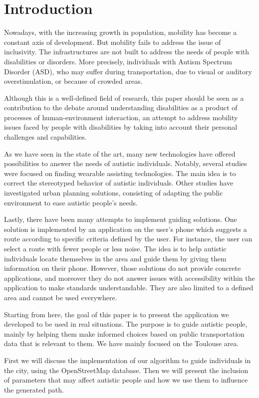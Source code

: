 \section{Introduction}


Nowadays, with the increasing growth in population, mobility has become a constant axis of development. But mobility fails to address the issue of inclusivity. The infrastructures are not built to address the needs of people with disabilities or disorders. More precisely, individuals with Autism Spectrum Disorder (ASD), who may suffer during transportation, due to visual or auditory overstimulation, or because of crowded areas.\newline


Although this is a well-defined field of research, this paper should be seen as a contribution to the debate around understanding disabilities as a product of processes of human-environment interaction, an attempt to address mobility issues faced by people with disabilities by taking into account their personal challenges and capabilities.\newline

As we have seen in the state of the art, many new technologies have offered possibilities to answer the needs of autistic individuals. Notably, several studies were focused on finding wearable assisting technologies. The main idea is to correct the stereotyped behavior of autistic individuals. Other studies have investigated urban planning solutions, consisting of adapting the public environment to ease autistic people's needs. \newline

Lastly, there have been many attempts to implement guiding solutions. One solution is implemented by an application on the user’s phone which suggests a route according to specific criteria defined by the user. For instance, the user can select a route with fewer people or less noise. The idea is to help autistic individuals locate themselves in the area and guide them by giving them information on their phone. However, those solutions do not provide concrete applications, and moreover they do not answer issues with accessibility within the application to make standards understandable. They are also limited to a defined area and cannot be used everywhere.\newline


Starting from here, the goal of this paper is to present the application we developed to be used in real situations. The purpose is to guide autistic people, mainly by helping them make informed choices based on public transportation data that is relevant to them. We have mainly focused on the Toulouse area. \newline


First we will discuss the implementation of our algorithm to guide individuals in the city, using the OpenStreetMap database. Then we will present the inclusion of parameters that may affect autistic people and how we use them to influence the generated path. 
